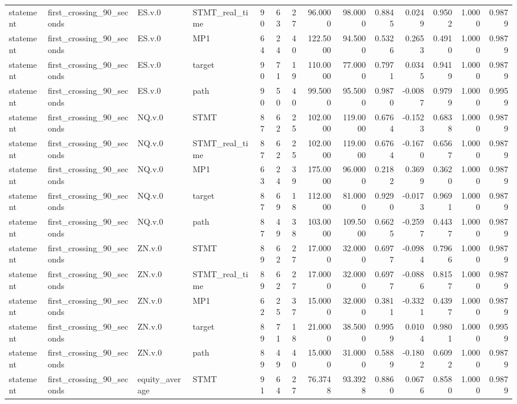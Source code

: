 \begin{tabular}{llllrrrrrrrrrr}
statement & first_crossing_90_seconds & ES.v.0 & STMT_real_time & 90 & 63 & 27 & 96.0000 & 98.0000 & 0.8845 & 0.0249 & 0.9502 & 1.0000 & 0.9879 \\
statement & first_crossing_90_seconds & ES.v.0 & MP1 & 64 & 24 & 40 & 122.5000 & 94.5000 & 0.5326 & 0.2653 & 0.4910 & 1.0000 & 0.9879 \\
statement & first_crossing_90_seconds & ES.v.0 & target & 90 & 71 & 19 & 110.0000 & 77.0000 & 0.7971 & 0.0345 & 0.9419 & 1.0000 & 0.9879 \\
statement & first_crossing_90_seconds & ES.v.0 & path & 90 & 50 & 40 & 99.5000 & 95.5000 & 0.9870 & -0.0087 & 0.9799 & 1.0000 & 0.9959 \\
statement & first_crossing_90_seconds & NQ.v.0 & STMT & 87 & 62 & 25 & 102.0000 & 119.0000 & 0.6764 & -0.1523 & 0.6838 & 1.0000 & 0.9879 \\
statement & first_crossing_90_seconds & NQ.v.0 & STMT_real_time & 87 & 62 & 25 & 102.0000 & 119.0000 & 0.6764 & -0.1670 & 0.6567 & 1.0000 & 0.9879 \\
statement & first_crossing_90_seconds & NQ.v.0 & MP1 & 63 & 24 & 39 & 175.0000 & 96.0000 & 0.2182 & 0.3699 & 0.3620 & 1.0000 & 0.9879 \\
statement & first_crossing_90_seconds & NQ.v.0 & target & 87 & 69 & 18 & 112.0000 & 81.0000 & 0.9290 & -0.0173 & 0.9691 & 1.0000 & 0.9879 \\
statement & first_crossing_90_seconds & NQ.v.0 & path & 87 & 49 & 38 & 103.0000 & 109.5000 & 0.6625 & -0.2597 & 0.4437 & 1.0000 & 0.9879 \\
statement & first_crossing_90_seconds & ZN.v.0 & STMT & 89 & 62 & 27 & 17.0000 & 32.0000 & 0.6977 & -0.0984 & 0.7966 & 1.0000 & 0.9879 \\
statement & first_crossing_90_seconds & ZN.v.0 & STMT_real_time & 89 & 62 & 27 & 17.0000 & 32.0000 & 0.6977 & -0.0886 & 0.8157 & 1.0000 & 0.9879 \\
statement & first_crossing_90_seconds & ZN.v.0 & MP1 & 62 & 25 & 37 & 15.0000 & 32.0000 & 0.3811 & -0.3321 & 0.4397 & 1.0000 & 0.9879 \\
statement & first_crossing_90_seconds & ZN.v.0 & target & 89 & 71 & 18 & 21.0000 & 38.5000 & 0.9959 & 0.0104 & 0.9801 & 1.0000 & 0.9959 \\
statement & first_crossing_90_seconds & ZN.v.0 & path & 89 & 49 & 40 & 15.0000 & 31.0000 & 0.5889 & -0.1802 & 0.6092 & 1.0000 & 0.9879 \\
statement & first_crossing_90_seconds & equity_average & STMT & 91 & 64 & 27 & 76.3748 & 93.3928 & 0.8860 & 0.0676 & 0.8580 & 1.0000 & 0.9879 \\

\end{tabular}
